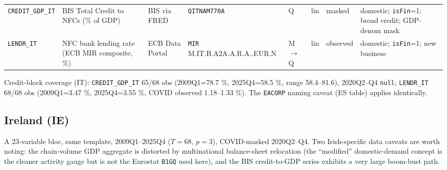 \begin{longtable}{@{}p{}p{}p{}p{}p{}p{}p{}p{}@{}}
\texttt{CREDIT\_GDP\_IT} & BIS Total Credit to NFCs (\% of GDP) & BIS via FRED & \texttt{QITNAM770A} & Q & lin & masked & domestic; \texttt{isFin}=1; broad credit; GDP-denom mask \\
\texttt{LENDR\_IT} & NFC bank lending rate (ECB MIR composite, \%) & ECB Data Portal & \texttt{MIR} M.\allowbreak IT.\allowbreak B.\allowbreak A2A.\allowbreak A.\allowbreak R.\allowbreak A.\allowbreak 2240.\allowbreak EUR.\allowbreak N & M$\to$Q & lin & observed & domestic; \texttt{isFin}=1; new business \\
\end{longtable}

\noindent Credit-block coverage (IT): \texttt{CREDIT\_GDP\_IT} 65/68 obs
(2009Q1=78.7 \%, 2025Q4=58.5 \%, range 58.4--81.6), 2020Q2--Q4 \texttt{null};
\texttt{LENDR\_IT} 68/68 obs (2009Q1=3.47 \%, 2025Q4=3.55 \%, COVID observed
1.18--1.33 \%). The \texttt{EACORP} naming caveat (ES table) applies identically.

\subsection{Ireland (IE)}\label{sec:data:IE}

A 23-variable bloc, same template, 2009Q1--2025Q4 ($T=68$, $p=3$), COVID-masked
2020Q2--Q4. Two Irish-specific data caveats are worth noting: the chain-volume
GDP aggregate is distorted by multinational balance-sheet relocation (the
``modified'' domestic-demand concept is the cleaner activity gauge but is not
the Eurostat \texttt{B1GQ} used here), and the BIS credit-to-GDP series exhibits
a very large boom-bust path.

